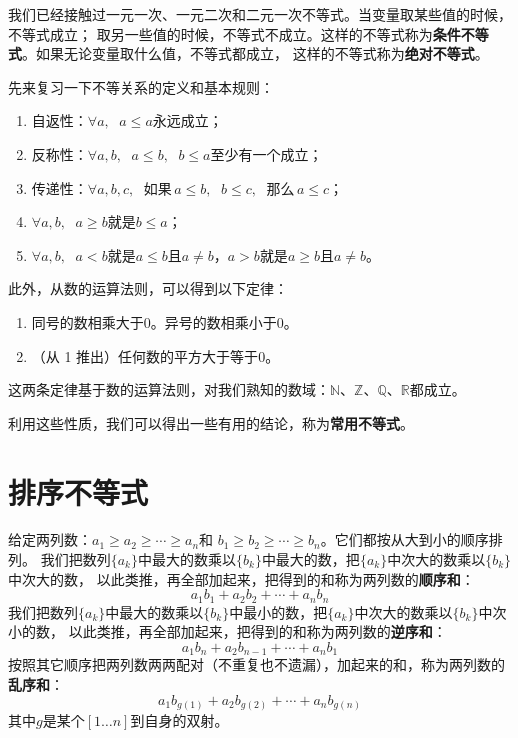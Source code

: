 \documentclass[12pt,UTF8,fontset=none]{ctexbook}
\begin{document}
我们已经接触过一元一次、一元二次和二元一次不等式。当变量取某些值的时候，不等式成立；
取另一些值的时候，不等式不成立。这样的不等式称为\textbf{条件不等式}。如果无论变量取什么值，不等式都成立，
这样的不等式称为\textbf{绝对不等式}。

先来复习一下不等关系的定义和基本规则：
\begin{enumerate}
    \item 自返性：$\forall a, \;\,\, a \leqslant a$永远成立；
    \item 反称性：$\forall a, b, \;\,\, a \leqslant b, \;\,\, b \leqslant a$至少有一个成立；
    \item 传递性：$\forall a, b, c, \;\,\, \mbox{如果}\, a \leqslant b, \;\,\, b \leqslant c, \;\,\, \mbox{那么}\, a \leqslant c$；
    \item $\forall a, b, \;\,\, a \geqslant b$就是$b \leqslant a$；
    \item $\forall a, b, \;\,\, a < b$就是$a \leqslant b$且$a \neq b$，$ a > b$就是$a \geqslant b$且$a \neq b$。
\end{enumerate}
此外，从数的运算法则，可以得到以下定律：
\begin{enumerate}
    \item 同号的数相乘大于$0$。异号的数相乘小于$0$。
    \item （从 1 推出）任何数的平方大于等于$0$。
\end{enumerate}
这两条定律基于数的运算法则，对我们熟知的数域：$\mathbb{N}$、$\mathbb{Z}$、$\mathbb{Q}$、$\mathbb{R}$都成立。

利用这些性质，我们可以得出一些有用的结论，称为\textbf{常用不等式}。

\section{排序不等式}

给定两列数：$a_1 \geqslant a_2 \geqslant \cdots \geqslant a_n$和
$b_1 \geqslant b_2 \geqslant \cdots \geqslant b_n$。它们都按从大到小的顺序排列。
我们把数列$\{a_k\}$中最大的数乘以$\{b_k\}$中最大的数，把$\{a_k\}$中次大的数乘以$\{b_k\}$中次大的数，
以此类推，再全部加起来，把得到的和称为两列数的\textbf{顺序和}：
$$ a_1b_1 + a_2b_2 + \cdots + a_nb_n $$
我们把数列$\{a_k\}$中最大的数乘以$\{b_k\}$中最小的数，把$\{a_k\}$中次大的数乘以$\{b_k\}$中次小的数，
以此类推，再全部加起来，把得到的和称为两列数的\textbf{逆序和}：
$$ a_1b_n + a_2b_{n-1} + \cdots + a_nb_1 $$
按照其它顺序把两列数两两配对（不重复也不遗漏），加起来的和，称为两列数的\textbf{乱序和}：
$$ a_1b_{g(1)} + a_2b_{g(2)} + \cdots + a_nb_{g(n)} $$
其中$g$是某个$[1\dots n]$到自身的双射。
\end{document}
